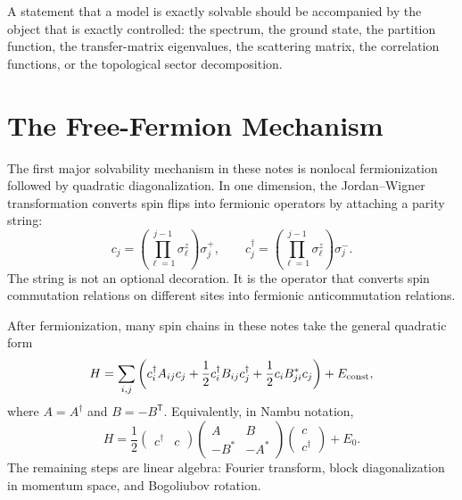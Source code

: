 \begin{principle}
A statement that a model is exactly solvable should be accompanied by the object that is exactly controlled: the spectrum, the ground state, the partition function, the transfer-matrix eigenvalues, the scattering matrix, the correlation functions, or the topological sector decomposition.
\end{principle}

\section{The Free-Fermion Mechanism}
\label{sec:free-fermion-mechanism}

The first major solvability mechanism in these notes is nonlocal fermionization followed by quadratic diagonalization.  In one dimension, the Jordan--Wigner transformation converts spin flips into fermionic operators by attaching a parity string:
\begin{equation}
\label{eq:conclusion-jw-convention}
    c_j
    =
    \left(\prod_{\ell=1}^{j-1}\sigma_\ell^z\right)\sigma_j^+,
    \qquad
    c_j^\dagger
    =
    \left(\prod_{\ell=1}^{j-1}\sigma_\ell^z\right)\sigma_j^- .
\end{equation}
The string is not an optional decoration.  It is the operator that converts spin commutation relations on different sites into fermionic anticommutation relations.

After fermionization, many spin chains in these notes take the general quadratic form
\begin{equation}
\label{eq:conclusion-quadratic-bdg}
    H
    =
    \sum_{i,j}
    \left(
        c_i^\dagger A_{ij}c_j
        +\frac12 c_i^\dagger B_{ij}c_j^\dagger
        +\frac12 c_i B_{ji}^*c_j
    \right)
    +E_{\rm const},
\end{equation}
where \(A=A^\dagger\) and \(B=-B^{\mathsf T}\).  Equivalently, in Nambu notation,
\begin{equation}
\label{eq:conclusion-bdg-form}
    H
    =
    \frac12
    \begin{pmatrix}
        c^\dagger & c
    \end{pmatrix}
    \begin{pmatrix}
        A & B\\
        -B^* & -A^*
    \end{pmatrix}
    \begin{pmatrix}
        c\\ c^\dagger
    \end{pmatrix}
    +E_0 .
\end{equation}
The remaining steps are linear algebra: Fourier transform, block diagonalization in momentum space, and Bogoliubov rotation.

